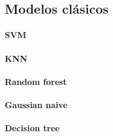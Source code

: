 \subsection{Modelos clásicos}

\paragraph{SVM}
\paragraph{KNN}
\paragraph{Random forest}
\paragraph{Gaussian naive}
\paragraph{Decision tree}
